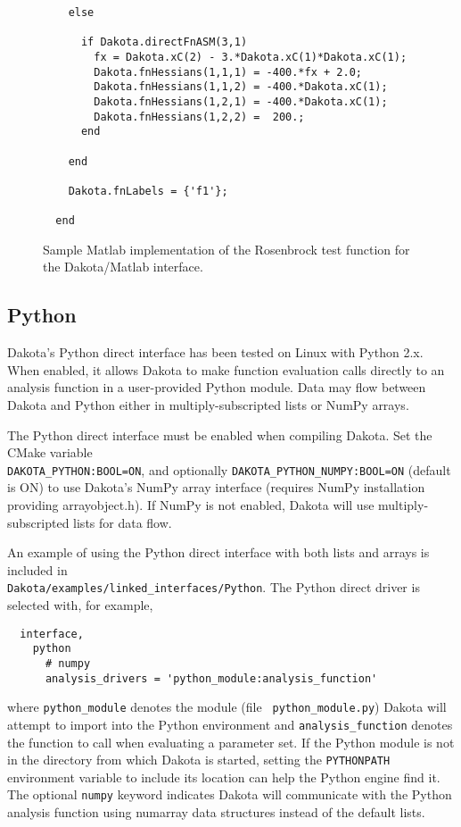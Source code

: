 \begin{figure}
\begin{bigbox}
\begin{tiny}
\begin{verbatim}
    else
    
      if Dakota.directFnASM(3,1) 
        fx = Dakota.xC(2) - 3.*Dakota.xC(1)*Dakota.xC(1);
        Dakota.fnHessians(1,1,1) = -400.*fx + 2.0;
        Dakota.fnHessians(1,1,2) = -400.*Dakota.xC(1); 
        Dakota.fnHessians(1,2,1) = -400.*Dakota.xC(1);
        Dakota.fnHessians(1,2,2) =  200.;
      end
    
    end
  
    Dakota.fnLabels = {'f1'};
   
  end
\end{verbatim}
\end{tiny}
\end{bigbox}
\caption{Sample Matlab implementation of the Rosenbrock test function
for the Dakota/Matlab interface.\label{advint:figure:matlabrosen}}
\end{figure}

\subsection{Python}\label{advint:existingdirect:python} 

Dakota's Python direct interface has been tested on Linux with Python
2.x. When enabled, it allows Dakota to make function evaluation calls
directly to an analysis function in a user-provided Python module.
Data may flow between Dakota and Python either in multiply-subscripted
lists or NumPy arrays.

The Python direct interface must be enabled when compiling Dakota.
Set the CMake variable \\ {\tt DAKOTA\_PYTHON:BOOL=ON}, and optionally
{\tt DAKOTA\_PYTHON\_NUMPY:BOOL=ON} (default is ON) to use Dakota's
NumPy array interface (requires NumPy installation providing
arrayobject.h). If NumPy is not enabled, Dakota will use
multiply-subscripted lists for data flow.

An example of using the Python direct interface with both lists and
arrays is included in \\
{\tt Dakota/examples/linked\_interfaces/Python}. The Python direct driver is
selected with, for example,
\begin{verbatim}
  interface,
    python
      # numpy
      analysis_drivers = 'python_module:analysis_function'
\end{verbatim}
where {\tt python\_module} denotes the module (file {\tt
  python\_module.py}) Dakota will attempt to import into the Python
environment and {\tt analysis\_function} denotes the function to call
when evaluating a parameter set. If the Python module is not in the
directory from which Dakota is started, setting the {\tt PYTHONPATH}
environment variable to include its location can help the Python
engine find it.  The optional {\tt numpy} keyword indicates Dakota
will communicate with the Python analysis function using numarray data
structures instead of the default lists.

